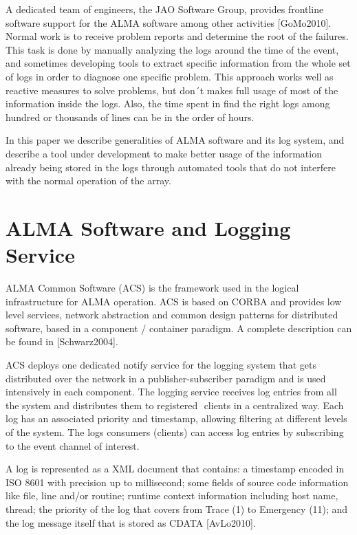 \documentclass[]{spie}  %
\begin{document}
A dedicated team of engineers, the JAO Software Group, provides frontline
software support for the ALMA software among other activities [GoMo2010].
Normal work is to receive problem reports and determine the root of the
failures. This task is done by manually analyzing the logs around the time of
the event, and sometimes developing tools to extract specific information from
the whole set of logs in order to diagnose one specific problem. This approach
works well as reactive measures to solve problems, but don´t makes full usage
of most of the information inside the logs. Also, the time spent in find the
right logs among hundred or thousands of lines can be in the order of hours.

In this paper we describe generalities of ALMA software and its log system, and
describe a tool under development to make better usage of the information
already being stored in the logs through automated tools that do not interfere
with the normal operation of the array.

\section{ALMA Software and Logging Service}
ALMA Common Software (ACS) is the framework used in the logical infrastructure
for ALMA operation. ACS is based on CORBA and provides low level services,
    network abstraction and common design patterns for distributed software,
    based in a component / container paradigm. A complete description can be
    found in [Schwarz2004].

ACS deploys one dedicated notify service for the logging system that gets
distributed over the network in a publisher-subscriber paradigm and is used
intensively in each component. The logging service receives log entries from
all the system and distributes them to registered  clients in a centralized
way. Each log has an associated priority and timestamp, allowing filtering at
different levels of the system. The logs consumers (clients) can access log
entries by subscribing to the event channel of interest.

A log is represented as a XML document that contains: a timestamp encoded in
ISO 8601 with precision up to millisecond; some fields of source code
information like file, line and/or routine; runtime context information
including host name, thread; the priority of the log that covers from Trace (1)
to Emergency (11); and the log message itself that is stored as CDATA
[AvLo2010].
 
\end{document}
